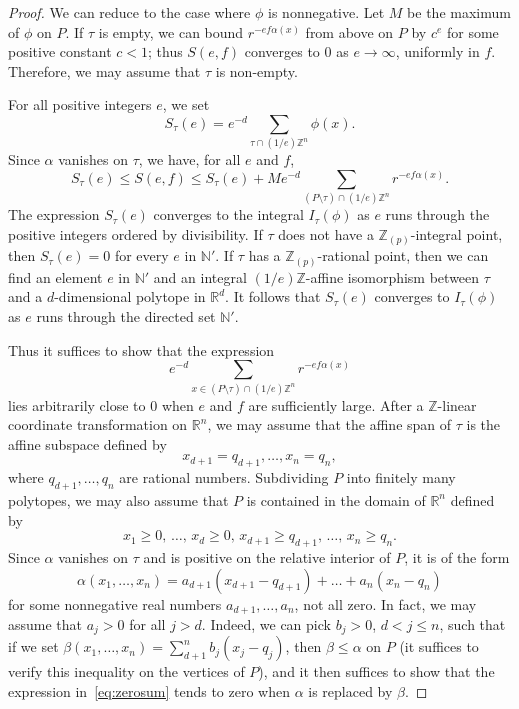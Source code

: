 \documentclass[JEP,XML,SOM,Unicode,NoFloatCountersInSection]{cedram}
\theoremstyle{definition}
\numberwithin{equation}{subsection}
\newcommand{\N}{\ensuremath{\mathbb{N}}}
\newcommand{\Z}{\ensuremath{\mathbb{Z}}}
\newcommand{\R}{\ensuremath{\mathbb{R}}}
\begin{document}
\begin{proof}
We can reduce to the case where $\phi$ is nonnegative. Let $M$ be the maximum of $\phi$ on $P$.
If $\tau $ is empty, we can bound $r^{-ef\alpha(x)}$ from above on $P$ by $c^e$ for some positive constant $c<1$; thus $S(e,f)$ converges to $0$ as $e\to \infty$, uniformly in $f$. Therefore, we may assume that $\tau$ is non-empty.

For all positive integers $e$, we set
\[
S_{\tau}(e)=e^{-d}\sum_{\tau\cap (1/e)\Z^n}\phi(x).
\]
Since $\alpha$ vanishes on $\tau$, we have, for all $e$ and $f$,
\[
S_{\tau}(e) \leq S(e,f)\leq S_{\tau}(e)+ Me^{-d}\sum_{(P\setminus \tau)\cap (1/e)\Z^n}r^{-ef\alpha(x)}.
\]
The expression $S_{\tau}(e)$ converges to the integral $I_{\tau}(\phi)$ as $e$ runs through the positive integers ordered by divisibility. If $\tau$ does not have a $\Z_{(p)}$-integral point,
then $S_{\tau}(e)=0$ for every $e$ in $\N'$.
If $\tau$ has a $\Z_{(p)}$-rational point, then we can find an element $e$ in $\N'$
and an integral $(1/e)\Z$-affine isomorphism between $\tau$ and a $d$-dimensional polytope in $\R^d$.
It follows that $S_{\tau}(e)$ converges to $I_{\tau}(\phi)$ as $e$ runs through the directed set $\N'$.

Thus it suffices to show that the expression
\begin{equation}\label{eq:zerosum}
e^{-d}\sum_{x\in (P\setminus \tau)\cap (1/e)\Z^n}r^{-ef\alpha(x)}
\end{equation}
lies arbitrarily close to $0$ when $e$ and $f$ are sufficiently large.
After a $\Z$-linear coordinate transformation on $\R^n$, we may assume that the affine span of $\tau$ is the affine subspace defined by
\[
x_{d+1}=q_{d+1},\ldots,x_n=q_n,
\]
where $q_{d+1},\ldots,q_n$ are rational numbers. Subdividing $P$ into finitely many polytopes, we may also assume that $P$ is contained in the domain of $\R^n$ defined by
\[
x_1\geq 0,\,\ldots,\,x_d\geq 0,\,x_{d+1}\geq q_{d+1},\,\ldots,\,x_n\geq q_n.
\]
Since $\alpha$ vanishes on $\tau$ and is positive on the relative interior of $P$, it is of the form
\[
\alpha(x_1,\ldots,x_n)=a_{d+1}(x_{d+1}-q_{d+1})+\ldots+ a_{n}(x_{n}-q_{n})
\]
for some nonnegative real numbers $a_{d+1},\ldots,a_n$, not all zero.
In fact, we may assume that $a_j>0$ for all $j>d$. Indeed, we can pick $b_j>0$, $d<j\le n$, such that if we set $\beta(x_1,\dots,x_n)=\sum_{d+1}^nb_j(x_j-q_j)$, then $\beta\le\alpha$ on $P$ (it suffices to verify this inequality on the vertices of $P$), and it then suffices to show that the expression in~\eqref{eq:zerosum} tends to zero when $\alpha$ is replaced by $\beta$.


\end{proof}
\end{document}
